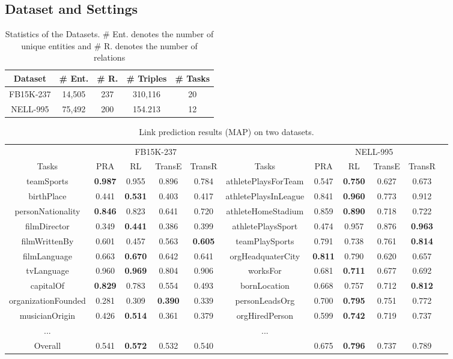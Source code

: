 \documentclass[11pt,letterpaper]{article}
\begin{document}
\subsection{Dataset and Settings}
\begin{table}[h!]
\small
\centering
 \begin{tabular}{||c c c c c||} 
 \hline
 Dataset & \# Ent. & \# R. & \# Triples & \# Tasks\\ 
 \hline\hline
FB15K-237 & 14,505 & 237 & 310,116 & 20 \\ 
 NELL-995 & 75,492 & 200 & 154.213 & 12\\
 \hline
 \end{tabular}
 \caption{Statistics of the Datasets. \# Ent. denotes the number of unique entities and \# R. denotes the number of relations}
 \label{stats}
\end{table}


\begin{table}[h]
\centering
\small
\begin{tabular}{ccccccccccc}\toprule
& \multicolumn{4}{c}{FB15K-237} & & \multicolumn{4}{c}{NELL-995} \\
\cmidrule{2-5} \cmidrule{7-10}
Tasks & PRA & RL & TransE & TransR & Tasks & PRA & RL & TransE & TransR \\ \midrule
teamSports & \textbf{0.987} & 0.955 & 0.896 & 0.784& athletePlaysForTeam & 0.547 &\textbf{0.750} & 0.627 & 0.673\\
birthPlace & 0.441 & \textbf{0.531} & 0.403 & 0.417 & athletePlaysInLeague & 0.841 & \textbf{0.960} & 0.773 & 0.912\\
personNationality & \textbf{0.846} & 0.823 & 0.641 & 0.720 & athleteHomeStadium & 0.859 & \textbf{0.890} & 0.718 & 0.722\\
filmDirector & 0.349 & \textbf{0.441} & 0.386 & 0.399 & athletePlaysSport& 0.474& 0.957 & 0.876 & \textbf{0.963}\\
filmWrittenBy & 0.601 & 0.457 & 0.563 & \textbf{0.605} & teamPlaySports& 0.791& 0.738 & 0.761 & \textbf{0.814}\\
filmLanguage & 0.663 & \textbf{0.670} & 0.642 & 0.641 & orgHeadquaterCity& \textbf{0.811}& 0.790 & 0.620 & 0.657 \\ 
tvLanguage & 0.960 & \textbf{0.969} & 0.804 & 0.906 & worksFor & 0.681 & \textbf{0.711} & 0.677 & 0.692 \\
capitalOf & \textbf{0.829} & 0.783 & 0.554 & 0.493 &bornLocation & 0.668 & 0.757 & 0.712 & \textbf{0.812}\\
organizationFounded & 0.281 & 0.309 & \textbf{0.390} & 0.339 & personLeadsOrg & 0.700 &\textbf{0.795} & 0.751 & 0.772\\
musicianOrigin & 0.426 & \textbf{0.514} & 0.361 & 0.379 & orgHiredPerson & 0.599 & \textbf{0.742} & 0.719 & 0.737 \\
... & &  & & & ...\\
\midrule
Overall & 0.541 & \textbf{0.572} & 0.532 & 0.540 &  & 0.675& \textbf{0.796} & 0.737 & 0.789\\
\bottomrule
\end{tabular}
\caption{Link prediction results (MAP) on two datasets.}
\label{result1}
\end{table}
\end{document}
